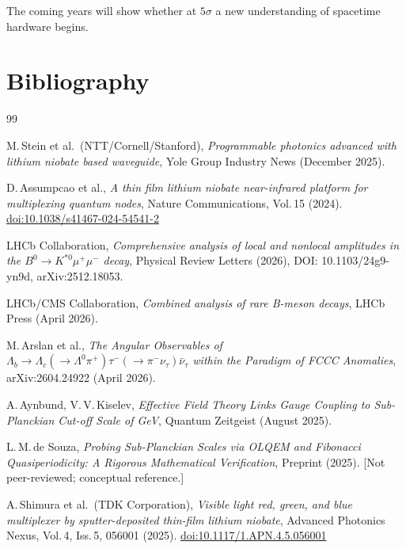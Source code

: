 \begin{keybox}
The coming years will show whether at $5\sigma$ a new understanding of
spacetime hardware begins.
\end{keybox}

\newpage
\section*{Bibliography}

\begin{thebibliography}{99}

M.\,Stein et al.\ (NTT/Cornell/Stanford),
\textit{Programmable photonics advanced with lithium niobate based waveguide},
Yole Group Industry News (December 2025).

D.\,Assumpcao et al.,
\textit{A thin film lithium niobate near-infrared platform for multiplexing quantum nodes},
Nature Communications, Vol.\,15 (2024).
\href{https://doi.org/10.1038/s41467-024-54541-2}{doi:10.1038/s41467-024-54541-2}

LHCb Collaboration,
\textit{Comprehensive analysis of local and nonlocal amplitudes in the
$B^0 \to K^{*0}\mu^+\mu^-$ decay},
Physical Review Letters (2026),
DOI: 10.1103/24g9-yn9d,
arXiv:2512.18053.

LHCb/CMS Collaboration,
\textit{Combined analysis of rare B-meson decays},
LHCb Press (April 2026).

M.\,Arslan et al.,
\textit{The Angular Observables of $\Lambda_b \to \Lambda_c(\to \Lambda^0\pi^+)
\tau^-(\to\pi^-\nu_\tau)\bar{\nu}_\tau$ within the Paradigm of FCCC Anomalies},
arXiv:2604.24922 (April 2026).

A.\,Aynbund, V.\,V.\,Kiselev,
\textit{Effective Field Theory Links Gauge Coupling to Sub-Planckian Cut-off Scale of GeV},
Quantum Zeitgeist (August 2025).

L.\,M.\,de Souza,
\textit{Probing Sub-Planckian Scales via OLQEM and Fibonacci Quasiperiodicity:
A Rigorous Mathematical Verification},
Preprint (2025). [Not peer-reviewed; conceptual reference.]

A.\,Shimura et al.\ (TDK Corporation),
\textit{Visible light red, green, and blue multiplexer by sputter-deposited
thin-film lithium niobate},
Advanced Photonics Nexus, Vol.\,4, Iss.\,5, 056001 (2025).
\href{https://doi.org/10.1117/1.APN.4.5.056001}{doi:10.1117/1.APN.4.5.056001}

\end{thebibliography}
